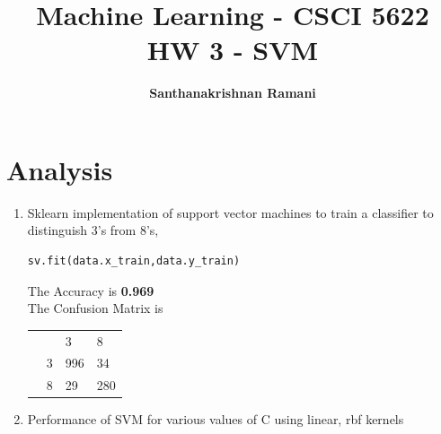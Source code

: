 \documentclass{article}
\date{\displaydate{date}}
\title{\textbf{Machine Learning - CSCI 5622} \\
HW 3 - SVM}
\author{\textbf{Santhanakrishnan Ramani}}
\begin{document}
\maketitle

\section*{Analysis}
\begin{enumerate}
\item
Sklearn implementation of support vector machines to train a classifier to distinguish 3's from 8's,
\begin{lstlisting}
sv.fit(data.x_train,data.y_train)
\end{lstlisting}

The Accuracy is \textbf{0.969}\\
The Confusion Matrix is 
\begin{minipage}[b]{0.4\textwidth}
    \begin{tabular}{l r|l l}                      
		& \multicolumn{1}{r|}{} &3   &8   \\ \cline{2-4}
		& \multicolumn{1}{r|}{3} &996   &34  \\
		& \multicolumn{1}{r|}{8} &29   &280  \\ 
	\end{tabular}
\end{minipage} 

\item
Performance of SVM for various values of C using linear, rbf kernels


\end{enumerate}
\end{document}
